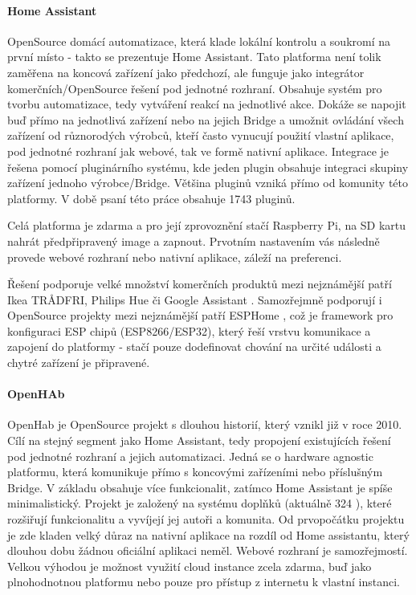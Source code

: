 \paragraph{Home Assistant}
OpenSource domácí automatizace, která klade lokální kontrolu a soukromí na první místo - takto se prezentuje Home Assistant. Tato platforma není tolik zaměřena na koncová zařízení jako předchozí, ale funguje jako integrátor komerčních/OpenSource řešení pod jednotné rozhraní. Obsahuje systém pro tvorbu automatizace, tedy vytváření reakcí na jednotlivé akce. Dokáže se napojit buď přímo na jednotlivá zařízení nebo na jejich Bridge a umožnit ovládání všech zařízení od různorodých výrobců, kteří často vynucují použití vlastní aplikace, pod jednotné rozhraní jak webové, tak ve formě nativní aplikace. Integrace je řešena pomocí pluginárního systému, kde jeden plugin obsahuje integraci skupiny zařízení jednoho výrobce/Bridge. Většina pluginů vzniká přímo od komunity této platformy. V době psaní této práce obsahuje 1743 pluginů. \cite{ha}

Celá platforma je zdarma a pro její zprovoznění stačí Raspberry Pi, na SD kartu nahrát předpřipravený image a zapnout. Prvotním nastavením vás následně provede webové rozhraní nebo nativní aplikace, záleží na preferenci. \cite{ha-doc}

Řešení podporuje velké množství komerčních produktů mezi nejznámější patří Ikea TRÅDFRI, Philips Hue či Google Assistant \cite{ha-integrations}. Samozřejmně podporují i OpenSource projekty mezi nejznámější patří ESPHome \cite{esphome}, což je framework pro konfiguraci ESP chipů (ESP8266/ESP32), který řeší vrstvu komunikace a zapojení do platformy - stačí pouze dodefinovat chování na určité události a chytré zařízení je připravené.

\paragraph{OpenHAb}
OpenHab je OpenSource projekt s dlouhou historií, který vznikl již v roce 2010. Cílí na stejný segment jako Home Assistant, tedy  propojení existujících řešení pod jednotné rozhraní a jejich automatizaci. Jedná se o hardware agnostic platformu, která komunikuje přímo s koncovými zařízeními nebo příslušným Bridge. V základu obsahuje více funkcionalit, zatímco Home Assistant je spíše minimalistický. Projekt je založený na systému doplňků (aktuálně 324 \cite{openhab-addons}), které rozšiřují funkcionalitu a vyvíjejí jej autoři a komunita. Od prvopočátku projektu je zde kladen velký důraz na nativní aplikace na rozdíl od Home assistantu, který dlouhou dobu žádnou oficiální aplikaci neměl. Webové rozhraní je samozřejmostí. Velkou výhodou je možnost využití cloud instance zcela zdarma, buď jako plnohodnotnou platformu nebo pouze pro přístup z internetu k vlastní instanci. \cite{openhab}

